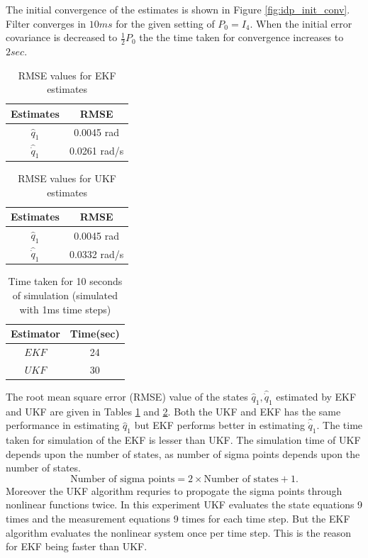 The initial convergence of the estimates is shown in Figure \ref{fig:idp_init_conv}. Filter converges in $10ms$ for the given setting of $P_0=I_4$. When the initial error covariance is decreased to $\frac{1}{2}P_0$ the the time taken for convergence increases to $2 sec$. 

\begin{table}[H]
    \centering
    \begin{tabular}{|c|c|}
    \hline
    Estimates &RMSE \\ \hline
    $\hat q_1$   &0.0045 rad \\ \hline
    $\hat {\dot q}_1$ & 0.0261 rad/s \\ \hline
    \end{tabular}
    \caption{RMSE values for EKF estimates}
    \label{tab:idp_rmse_ekf}
\end{table}

\begin{table}[H]
    \centering
    \begin{tabular}{|c|c|}
    \hline
    Estimates &RMSE \\ \hline
    $\hat q_1$   &0.0045 rad \\ \hline
    $\hat {\dot q}_1$ & 0.0332 rad/s\\ \hline
    \end{tabular}
    \caption{RMSE values for UKF estimates}
    \label{tab:idp_rmse_ukf}
\end{table}

\begin{table}[H]
    \centering
    \begin{tabular}{|c|c|}
    \hline
    Estimator &Time(sec) \\ \hline
    $EKF$ &24 \\ \hline
    $UKF$ &30 \\ \hline
    \end{tabular}
    \caption{Time taken for 10 seconds of simulation (simulated with 1ms time steps)}
    \label{tab:idp_sim_time}
\end{table}
The root mean square error (RMSE) value of the states $\hat q_1, \hat{\dot q}_1 $ estimated by EKF and UKF are given in Tables \ref{tab:idp_rmse_ekf} and \ref{tab:idp_rmse_ukf}. Both the UKF and EKF has the same performance in estimating $\hat q_1$ but EKF performs better in estimating $\hat{\dot q}_1$. The time taken for simulation of the EKF is lesser than UKF. The simulation time of UKF depends upon the number of states, as number of sigma points depends upon the number of states. $$\text{Number of sigma points}=2\times \text{Number of states} +1.$$  Moreover the UKF algorithm requries to propogate the sigma points through nonlinear functions twice. In this experiment UKF evaluates the state equations 9 times and the measurement equations 9 times for each time step. But the EKF algorithm evaluates the nonlinear system once per time step. This is the reason for EKF being faster than UKF. 

